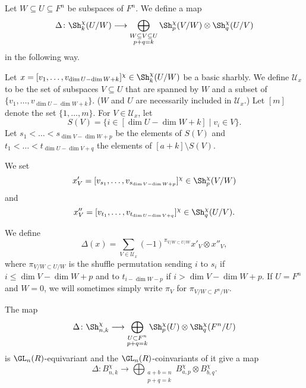 \begin{definition}
Let $W \subseteq U \subseteq F^n$ be subspaces of $F^n$. We define a map 
\[ \Delta\colon \Sh^\chi_{k}(U/W) \longrightarrow \bigoplus_{\substack{W\subseteq V \subseteq U\\p+q=k}} \Sh^\chi_{p}(V/W) \otimes \Sh^\chi_{q}(U/V)\]
in the following way. 

Let $x = [v_1, \dots, v_{\dim U - \dim W+k}]^\chi\in \Sh^\chi_{k}(U/W)$ be a basic sharbly. We define $\mathcal U_x$ to be the set of subspaces $V\subseteq U$ that are spanned by $W$ and a subset of $\{v_1, \dots, v_{\dim U- \dim W+k}\}$. ($W$ and $U$ are necessarily included in $\mathcal U_x$.) Let $[m]$ denote the set $\{1,\ldots,m\}$. For $V \in \mathcal U_x$, let 
\[S(V) = \{ i \in [\dim U - \dim W+k] \mid v_i \in V\}.\]
 Let $s_1<\dots <s_{\dim V - \dim W+p}$ be the elements of $S(V)$ and $t_1< \dots< t_{\dim U-\dim V +q}$ the elements of $[a+k] \setminus S(V)$. 

We set
\[ x'_{V} =  [ v_{s_1},\dots, v_{s_{\dim V - \dim W+p}}]^\chi \in \Sh^\chi_p(V/W)\]
and
\[x''_{V} =  [ v_{t_1},\dots, v_{t_{\dim U-\dim V +q}}]^\chi \in \Sh^\chi_q(U/V).\]

We define
\[ \Delta(x) = \sum_{V \in \mathcal U_x} (-1)^{\pi_{V/W\subset U/W}} x'_{V} \otimes x''_{V},\]
where $\pi_{V/W\subset U/W}$ is the shuffle permutation sending $i$ to $s_i$ if $i \le \dim V - \dim W+ p$ and to $t_{i-\dim W-p}$ if $i>\dim V - \dim W +p$. If $U=F^n$ and $W=0$, we will sometimes simply write $\pi_V$ for $\pi_{V/W \subset F^n/W}$.
\end{definition}

\begin{lemma}
The map
\[ \Delta\colon \Sh^\chi_{n,k} \longrightarrow \bigoplus_{\substack{U \subset F^n\\p+q=k}} \Sh^\chi_{p}(U) \otimes \Sh^\chi_{q}(F^n/U)\]
is $\GL_n(R)$-equivariant and the $\GL_n(R)$-coinvariants of it give a map
\[ \Delta\colon B^\chi_{n,k} \longrightarrow \bigoplus_{\substack{a+b=n\\p+q=k}} B^\chi_{a,p} \otimes B^\chi_{b,q}.\]
\end{lemma}

